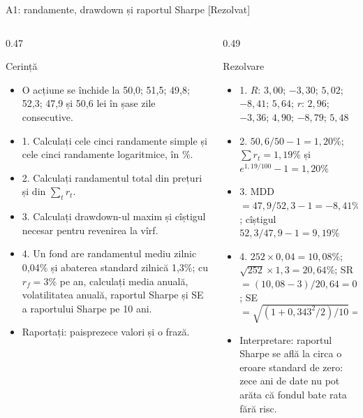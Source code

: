 \begin{frame}{A1: randamente, drawdown și raportul Sharpe [Rezolvat]}
\itemsize{\scriptsize}
\begin{columns}[T]
\begin{column}{0.47\textwidth}
\begin{block}{Cerință}
\begin{itemize}
    \item O acțiune se închide la 50,0; 51,5; 49,8; 52,3; 47,9 și 50,6 lei în șase zile consecutive.
    \item 1. Calculați cele cinci randamente simple și cele cinci randamente logaritmice, în \%.
    \item 2. Calculați randamentul total din prețuri și din $\sum_t r_t$.
    \item 3. Calculați drawdown-ul maxim și cîștigul necesar pentru revenirea la vîrf.
    \item 4. Un fond are randamentul mediu zilnic 0,04\% și abaterea standard zilnică 1,3\%; cu $r_f = 3\%$ pe an, calculați media anuală, volatilitatea anuală, raportul Sharpe și SE a raportului Sharpe pe 10 ani.
    \item Raportați: paisprezece valori și o frază.
\end{itemize}
\end{block}
\end{column}
\begin{column}{0.49\textwidth}
\begin{exampleblock}{Rezolvare}
\begin{itemize}
    \item 1. $R$: $3{,}00$; $-3{,}30$; $5{,}02$; $-8{,}41$; $5{,}64$; $r$: $2{,}96$; $-3{,}36$; $4{,}90$; $-8{,}79$; $5{,}48$
    \item 2. $50{,}6/50 - 1 = 1{,}20\%$; $\sum r_t = 1{,}19\%$ și $e^{1{,}19/100} - 1 = 1{,}20\%$
    \item 3. MDD $= 47{,}9/52{,}3 - 1 = -8{,}41\%$; cîștigul $52{,}3/47{,}9 - 1 = 9{,}19\%$
    \item 4. $252 \times 0{,}04 = 10{,}08\%$; $\sqrt{252} \times 1{,}3 = 20{,}64\%$; SR $= (10{,}08 - 3)/20{,}64 = 0{,}343$; SE $= \sqrt{(1 + 0{,}343^2/2)/10} = 0{,}33$
    \item Interpretare: raportul Sharpe se află la circa o eroare standard de zero: zece ani de date nu pot arăta că fondul bate rata fără risc.
\end{itemize}
\end{exampleblock}
\end{column}
\end{columns}
\end{frame}

